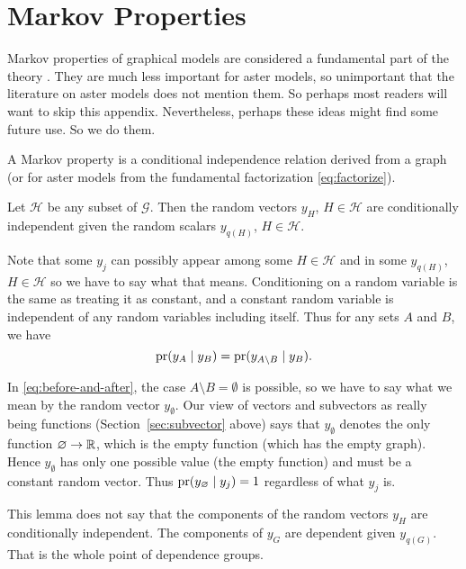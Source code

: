 
\chapter{Markov Properties}
\label{app:markov}

Markov properties of graphical models are considered a fundamental part
of the theory \citep[Chapter~3]{lauritzen}.  They are much less important
for aster models, so unimportant that the literature on aster models
does not mention them.
So perhaps most readers will want to skip this appendix.  Nevertheless,
perhaps these ideas might find some future use.  So we do them.

A Markov property is a conditional independence relation derived from a
graph (or for aster models from the fundamental factorization
\eqref{eq:factorize}).

\begin{lemma} \label{lem:markov}
Let $\mathcal{H}$ be any subset of $\mathcal{G}$.  Then the random vectors
$y_H$, $H \in \mathcal{H}$ are conditionally independent given
the random scalars $y_{q(H)}$, $H \in \mathcal{H}$.
\end{lemma}

Note that some $y_j$ can possibly appear among some $H \in \mathcal{H}$
and in some $y_{q(H)}$, $H \in \mathcal{H}$ so we have to say what that means.
Conditioning on a random variable is the same as treating it as constant,
and a constant random variable is independent of any random variables
including itself.  Thus for any sets $A$ and $B$, we have
\begin{equation} \label{eq:before-and-after}
   \operatorname{pr}(y_A \mid y_B)
   =
   \operatorname{pr}(y_{A \setminus B} \mid y_B).
\end{equation}

In \eqref{eq:before-and-after}, the case $A \setminus B = \emptyset$
is possible,
so we have to say what we mean by the random vector $y_\emptyset$.
Our view of vectors and subvectors as really
being functions (Section~\ref{sec:subvector} above) says that $y_\emptyset$
denotes the only function $\varnothing \to \mathbb{R}$, which is the empty function
(which has the empty graph).  Hence $y_\emptyset$ has only one possible
value (the empty function) and must be a constant random vector.
Thus $\operatorname{pr}(y_\varnothing \mid y_j) = 1$ regardless of what $y_j$ is.

This lemma does not say that the components of the random vectors $y_H$ are
conditionally independent.  The components of $y_G$ are dependent given
$y_{q(G)}$.  That is the whole point of dependence groups.

